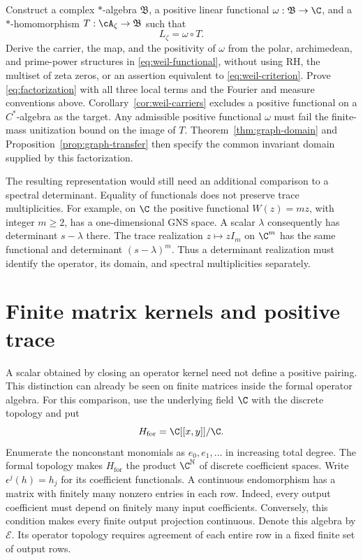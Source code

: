 \begin{openproblem}
Construct a complex $*$-algebra $\mathfrak B$, a positive linear
functional $\omega:\mathfrak B\to\C$, and a $*$-homomorphism
$T:\cA_\zeta\to\mathfrak B$ such that
\begin{equation}
 L_\zeta=\omega\circ T.
 \label{eq:factorization}
\end{equation}
Derive the carrier, the map, and the positivity of $\omega$ from the
polar, archimedean, and prime-power structures in
\eqref{eq:weil-functional}, without using RH, the multiset of zeta zeros,
or an assertion equivalent to \eqref{eq:weil-criterion}.  Prove
\eqref{eq:factorization} with all three local terms and the Fourier and
measure conventions above.  Corollary~\ref{cor:weil-carriers} excludes
a positive functional on a $C^*$-algebra as the target.
Any admissible positive functional $\omega$ must fail the finite-mass
unitization bound on the image of $T$.
Theorem~\ref{thm:graph-domain} and
Proposition~\ref{prop:graph-transfer} then specify the common invariant
domain supplied by this factorization.
\end{openproblem}

The resulting representation would still need an additional comparison
to a spectral determinant.  Equality of functionals does not preserve
trace multiplicities.  For example, on $\C$ the positive functional
$W(z)=mz$, with integer $m\geq2$, has a one-dimensional GNS space.
A scalar $\lambda$ consequently has determinant $s-\lambda$ there.
The trace realization $z\mapsto zI_m$ on $\C^m$ has the same functional
and determinant $(s-\lambda)^m$.  Thus a determinant realization must
identify the operator, its domain, and spectral multiplicities separately.


\section{Finite matrix kernels and positive trace}
\label{sec:weil-formal-kernels}

A scalar obtained by closing an operator kernel need not define a
positive pairing.  This distinction can already be seen on finite
matrices inside the formal operator algebra.
For this comparison, use the underlying field $\C$ with the discrete
topology and put
\[
 H_{\mathrm{for}}=\C[[x,y]]/\C.
\]
Enumerate the nonconstant monomials as $e_0,e_1,\ldots$ in increasing
total degree.  The formal topology makes $H_{\mathrm{for}}$ the product
$\C^{\mathbb N}$ of discrete coefficient spaces.  Write
$\epsilon^j(h)=h_j$ for its coefficient functionals.
A continuous endomorphism has a matrix with finitely many nonzero entries
in each row.  Indeed, every output coefficient must depend on finitely
many input coefficients.  Conversely, this condition makes every finite
output projection continuous.  Denote this algebra by $\mathscr E$.
Its operator topology requires agreement of each entire row in a fixed
finite set of output rows.

